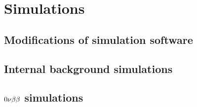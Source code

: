 \section{Simulations}
\subsection{Modifications of simulation software}
\subsection{Internal background simulations}
\subsection{$0\nu\beta\beta$ simulations}
